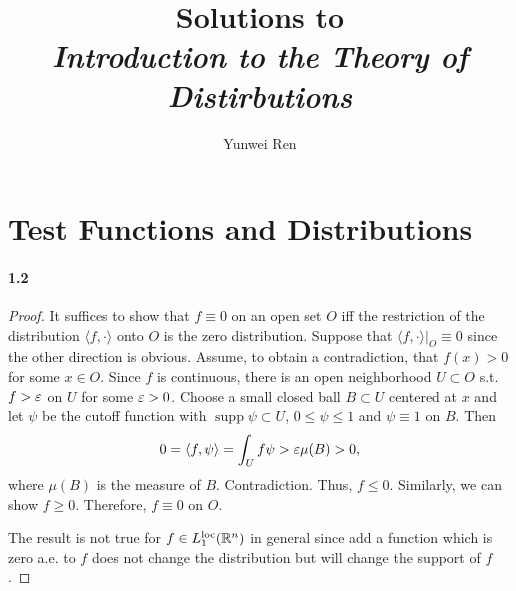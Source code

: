 

\DeclareMathOperator{\supp}{supp}

\title{Solutions to \\ \textit{Introduction to the Theory of Distirbutions}}
\author{Yunwei Ren}
\date{}


\maketitle
\tableofcontents

\vspace{1cm}

\section{Test Functions and Distributions}
\paragraph{1.2}
\begin{proof}
  It suffices to show that $f \equiv 0$ on an open set $O$ iff the restriction
  of the distribution $\langle f, \cdot\rangle$ onto $O$ is the zero
  distribution. Suppose that $\langle f, \cdot\rangle|_O \equiv 0$ since the
  other direction is obvious. Assume, to obtain a contradiction, that
  $f(x) > 0$ for some $x \in O$. Since $f$ is continuous, there is an open
  neighborhood $U \subset O$ s.t. $f > \varepsilon$ on $U$ for some $\varepsilon > 0$. Choose
  a small closed ball $B \subset U$ centered at $x$ and let $\psi$ be the 
  cutoff function with $\supp\psi \subset U$, $0 \le \psi \le 1$ and
  $\psi \equiv 1$ on $B$. Then
  \[
    0 = \langle f, \psi\rangle = \int_U f\psi > \varepsilon\mu(B) > 0,
  \]
  where $\mu(B)$ is the measure of $B$. Contradiction. Thus, $f \le 0$.
  Similarly, we can show $f \ge 0$. Therefore, $f \equiv 0$ on $O$.
  
  The result is not true for $f \in L_1^{\mathrm{loc}}(\mathbb{R}^n)$ in general
  since add a function which is zero a.e. to $f$ does not change the
  distribution but will change the support of $f$. 
\end{proof}

